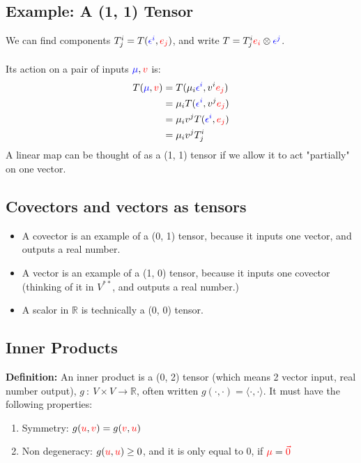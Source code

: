 \documentclass[10pt]{article}
\newcommand{\R}{\mathbb{R}}
\begin{document}
\subsection*{Example: A (1, 1) Tensor}
We can find components $T_j^i = T(\textcolor{blue}{\epsilon^i}, \textcolor{red}{e_j})$, and write $T = T_j^i \textcolor{red}{e_i} \otimes \textcolor{blue}{\epsilon^j}$.\\\\
Its action on a pair of inputs $\textcolor{blue}{\mu}, \textcolor{red}{v}$ is:
\begin{align*}
    T(\textcolor{blue}{\mu}, \textcolor{red}{v}) &= T(\mu_i\textcolor{blue}{\epsilon^i}, v^i \textcolor{red}{e_j})\\
    &= \mu_i T(\textcolor{blue}{\epsilon^i}, v^j \textcolor{red}{e_j})\\
    &= \mu_i v^j T(\textcolor{blue}{\epsilon^i}, \textcolor{red}{e_j})\\
    &= \mu_i v^j T_j^i
\end{align*}
A linear map can be thought of as a (1, 1) tensor if we allow it to act "partially" on one vector.

\subsection*{Covectors and vectors as tensors}
\begin{itemize}
    \item A covector is an example of a (0, 1) tensor, because it inputs one vector, and outputs a real number.
    \item A vector is an example of a (1, 0) tensor, because it inputs one covector (thinking of it in $V^{**}$, and outputs a real number.)
    \item A scalor in $\R$ is technically a (0, 0) tensor.
\end{itemize}

\subsection*{Inner Products}
\textbf{Definition:} An inner product is a (0, 2) tensor (which means 2 vector input, real number output), $g \::\: V \times V \rightarrow \R$, often written $g(\cdot, \cdot) = \langle \cdot, \cdot \rangle$.  It must have the following properties:
\begin{enumerate}
    \item Symmetry: $g(\textcolor{red}{u}, \textcolor{red}{v}) = g(\textcolor{red}{v}, \textcolor{red}{u})$
    \item Non degeneracy: $g(\textcolor{red}{u}, \textcolor{red}{u}) \geq 0$, and it is only equal to 0, if $\textcolor{red}{\mu} = \textcolor{red}{\vec{0}}$
\end{enumerate}
\end{document}
